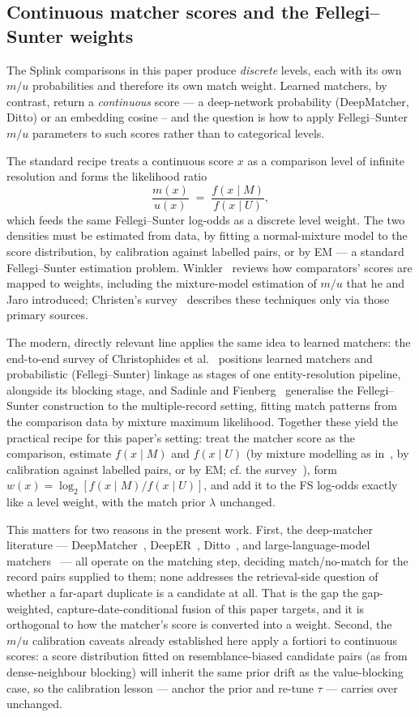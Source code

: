 \documentclass[11pt]{article}
\begin{document}
\subsection{Continuous matcher scores and the Fellegi--Sunter weights}
The Splink comparisons in this paper produce \emph{discrete} levels, each with its own $m/u$ probabilities and therefore its own match weight. Learned matchers, by contrast, return a \emph{continuous} score --- a deep-network probability (DeepMatcher, Ditto) or an embedding cosine -- and the question is how to apply Fellegi--Sunter $m/u$ parameters to such scores rather than to categorical levels.

The standard recipe treats a continuous score $x$ as a comparison level of infinite resolution and forms the likelihood ratio
\[
 \frac{m(x)}{u(x)} \;=\; \frac{f(x \mid M)}{f(x \mid U)},
\]
which feeds the same Fellegi--Sunter log-odds as a discrete level weight. The two densities must be estimated from data, by fitting a normal-mixture model to the score distribution, by calibration against labelled pairs, or by EM --- a standard Fellegi--Sunter estimation problem. Winkler~\cite{winkler2006} reviews how comparators' scores are mapped to weights, including the mixture-model estimation of $m/u$ that he and Jaro introduced; Christen's survey~\cite{christen2012} describes these techniques only via those primary sources.

The modern, directly relevant line applies the same idea to learned matchers: the end-to-end survey of Christophides et al.~\cite{christophides2021} positions learned matchers and probabilistic (Fellegi--Sunter) linkage as stages of one entity-resolution pipeline, alongside its blocking stage, and Sadinle and Fienberg~\cite{sadinle2013} generalise the Fellegi--Sunter construction to the multiple-record setting, fitting match patterns from the comparison data by mixture maximum likelihood. Together these yield the practical recipe for this paper's setting: treat the matcher score as the comparison, estimate $f(x\mid M)$ and $f(x\mid U)$ (by mixture modelling as in~\cite{winkler2006}, by calibration against labelled pairs, or by EM; cf. the survey~\cite{christen2012}), form $w(x)=\log_2[f(x\mid M)/f(x\mid U)]$, and add it to the FS log-odds exactly like a level weight, with the match prior $\lambda$ unchanged.

This matters for two reasons in the present work. First, the deep-matcher literature --- DeepMatcher~\cite{mudgal2018}, DeepER~\cite{ebreheem2018}, Ditto~\cite{li2020ditto}, and large-language-model matchers~\cite{peeters2023} --- all operate on the matching step, deciding match/no-match for the record pairs supplied to them; none addresses the retrieval-side question of whether a far-apart duplicate is a candidate at all. That is the gap the gap-weighted, capture-date-conditional fusion of this paper targets, and it is orthogonal to how the matcher's score is converted into a weight. Second, the $m/u$ calibration caveats already established here apply a fortiori to continuous scores: a score distribution fitted on resemblance-biased candidate pairs (as from dense-neighbour blocking) will inherit the same prior drift as the value-blocking case, so the calibration lesson --- anchor the prior and re-tune $\tau$ --- carries over unchanged.
\end{document}
